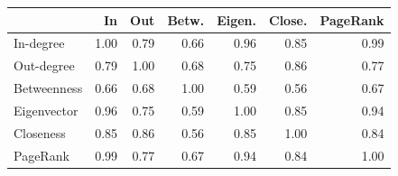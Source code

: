 
\begin{tabular}{lrrrrrr}
\toprule
  & In & Out & Betw. & Eigen. & Close. & PageRank\\
\midrule
In-degree & 1.00 & 0.79 & 0.66 & 0.96 & 0.85 & 0.99\\
Out-degree & 0.79 & 1.00 & 0.68 & 0.75 & 0.86 & 0.77\\
Betweenness & 0.66 & 0.68 & 1.00 & 0.59 & 0.56 & 0.67\\
Eigenvector & 0.96 & 0.75 & 0.59 & 1.00 & 0.85 & 0.94\\
Closeness & 0.85 & 0.86 & 0.56 & 0.85 & 1.00 & 0.84\\
PageRank & 0.99 & 0.77 & 0.67 & 0.94 & 0.84 & 1.00\\
\bottomrule
\end{tabular}

